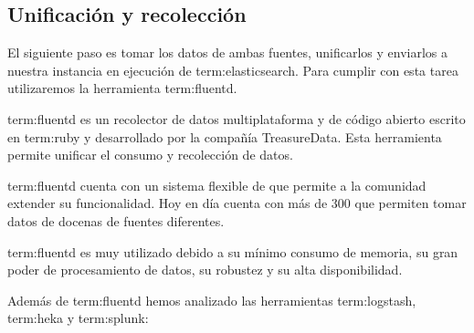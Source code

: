 \subsection{Unificación y recolección}
\label{unificacion_y_recoleccion}

El siguiente paso es tomar los datos de ambas fuentes, unificarlos y enviarlos
a nuestra instancia en ejecución de \gls{term:elasticsearch}. Para cumplir con
esta tarea utilizaremos la herramienta \gls{term:fluentd}.

\gls{term:fluentd} es un recolector de datos multiplataforma y de código abierto
escrito en \gls{term:ruby} y desarrollado por la compañía TreasureData. Esta
herramienta permite unificar el consumo y recolección de datos.

\gls{term:fluentd} cuenta con un sistema flexible de  que permite
a la comunidad extender su funcionalidad. Hoy en día cuenta con más de 300
 que permiten tomar datos de docenas de fuentes diferentes.

\gls{term:fluentd} es muy utilizado debido a su mínimo consumo de memoria, su
gran poder de procesamiento de datos, su robustez y su alta disponibilidad.

Además de \gls{term:fluentd} hemos analizado las herramientas
\gls{term:logstash}, \gls{term:heka} y \gls{term:splunk}:

